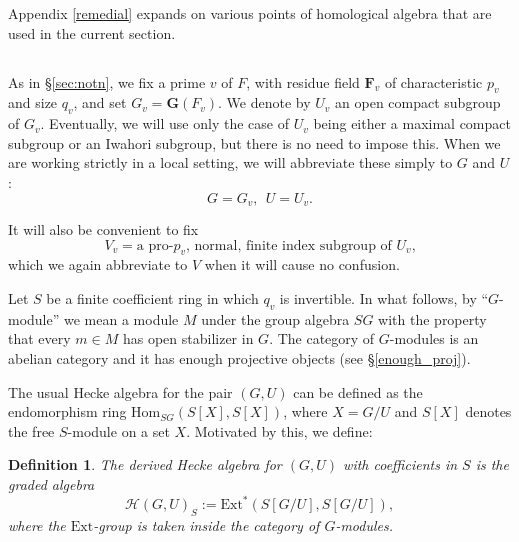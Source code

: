 \documentclass[10pt]{amsart}
\newcommand{\Ext}{\mathrm{Ext}}
\newcommand{\Hom}{\mathrm{Hom}}
\newcommand{\G}{\mathbf{G}}
\newtheorem{Definition}[subsection]{Definition}
\theoremstyle{remark}
\begin{document}
       Appendix \ref{remedial} expands on various points of homological algebra that are used in the current section.
                                           
 
     
     \subsection{}
       As in \S \ref{sec:notn},  we fix a prime $v$ of $F$, with residue field  $\mathbf{F}_v$ of characteristic $p_v$ and size $q_v$,  and set 
       $ G_v = \G(F_v)$. We denote by $U_v$ an open compact subgroup of $G_v$.
              Eventually, we will use only the case of $U_v$ being either a maximal compact subgroup or an Iwahori subgroup, but there is no need to impose this. When we are working strictly in a local setting, we will abbreviate these simply to $G$ and $U$:
       $$ G = G_v, \ \ U = U_v.$$ 
 
       
       It will also be convenient to fix 
\begin{equation} \label{Vvdef} V_v = \mbox{a pro-$p_v$, normal, finite index subgroup of $U_v$,}\end{equation}
which we  again abbreviate to $V$ when it will cause no confusion.        
       
       
       
        Let $S$ be a finite coefficient ring in which $q_v$ is invertible. 
In what follows, by ``$G$-module'' we mean a module $M$ 
under the group algebra $SG$ with the property that every  $m \in M$
has open stabilizer in $G$.   
       The category of $G$-modules is an abelian category and it has enough projective objects (see \S \ref{enough_proj}). 
       
       
        The usual Hecke algebra  for the pair $(G, U)$ can be defined as the endomorphism ring $\Hom_{SG}(S[X], S[X])$, where $X = G/U$ and 
$S[X]$ denotes the free $S$-module on a set $X$.  Motivated by this, we define: 


       \begin{Definition} \label{Extdefn} 
          The derived Hecke algebra for $(G, U)$  with coefficients in $S$ is the graded algebra \begin{equation} \label{firstdef} \mathscr{H}(G,U)_{S}:= \Ext^*(S [G/U], S [G/U]),\end{equation}
where the $\Ext$-group is taken inside the category of  $G$-modules.  

 \end{Definition}
 
\end{document}
